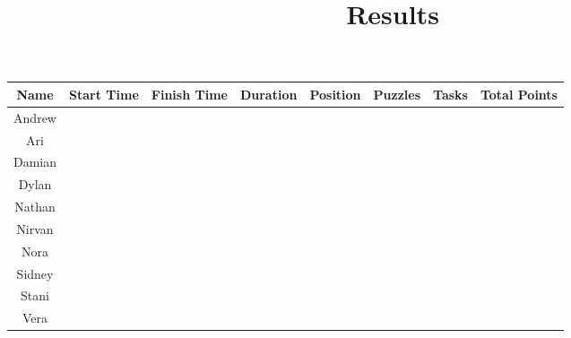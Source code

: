 \documentclass{article}
\begin{document}
\title{Results}
\maketitle

\begin{center}
\begin{tabular} { | c || c | c | c | c | c | c | c | }
\hline
\textbf{  Name  } & \textbf{  Start Time  } & \textbf{  Finish Time  } & \textbf{  Duration  } & \textbf{  Position  } & \textbf{  Puzzles  } & \textbf{  Tasks  } & \textbf{ Total Points } \\ \hline
Andrew & & & & & & & \\ \hline
Ari & & & & & & & \\ \hline
Damian & & & & & & & \\ \hline
Dylan & & & & & & & \\ \hline
Nathan & & & & & & & \\ \hline
Nirvan & & & & & & & \\ \hline
Nora & & & & & & & \\ \hline
Sidney & & & & & & & \\ \hline
Stani & & & & & & & \\ \hline
Vera & & & & & & & \\
\hline
\end{tabular}
\end{center}
\end{document}
